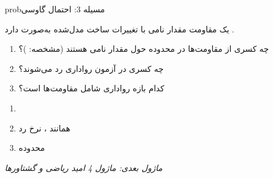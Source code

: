 \begin{PSbox}[unbreakable]{prob}{مسیله 3: احتمال گاوسی}

یک مقاومت مقدار نامی \lr{\mbox{1000\ensuremath{\Omega}}} با تغییرات ساخت مدل‌شده به‌صورت  دارد .

\begin{enumerate}
\def\labelenumi{(\PSalph{enumi})}
\tightlist
\item
  چه کسری از مقاومت‌ها در محدوده  حول مقدار نامی هستند (مشخصه: )؟
\item
  چه کسری در آزمون رواداری  رد می‌شوند؟
\item
  کدام بازه رواداری شامل  مقاومت‌ها است؟
\end{enumerate}

\PSsolution{} 

\begin{enumerate}
\def\labelenumi{(\PSalph{enumi})}
\tightlist
\item
\item
   همانند ، نرخ رد 
\item
   محدوده \lr{$[985,\, 1015]\Omega$}
\end{enumerate}

\emph{ماژول بعدی: {ماژول 4  امید ریاضی و گشتاورها}}

\end{PSbox}
